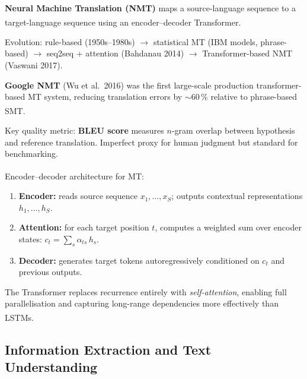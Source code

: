 \begin{tcbitemize}[ skin=sectionraster ]

    \tcbitem[title=Machine Translation, raster multicolumn=3]
    \textbf{Neural Machine Translation (NMT)} maps a source-language sequence to a
    target-language sequence using an encoder--decoder
    Transformer.\textsuperscript{\cite[][p.~7]{dhamaniIntroductionGenerativeAI2024}}

    Evolution: rule-based (1950s--1980s) $\to$ statistical MT (IBM models, phrase-based)
    $\to$ seq2seq + attention (Bahdanau 2014) $\to$ Transformer-based NMT (Vaswani 2017).

    \textbf{Google NMT} (Wu et al.\ 2016) was the first large-scale production
    transformer-based MT system, reducing translation errors by $\sim$60\,\% relative to
    phrase-based
    SMT.\textsuperscript{\cite[][p.~9]{dhamaniIntroductionGenerativeAI2024}}

    Key quality metric: \textbf{BLEU score} measures $n$-gram overlap between hypothesis
    and reference translation. Imperfect proxy for human judgment but standard for
    benchmarking.

    \tcbitem[title=Sequence-to-Sequence with Attention, raster multicolumn=3]
    Encoder--decoder architecture for
    MT:\textsuperscript{\cite[][p.~7-8]{dhamaniIntroductionGenerativeAI2024}}
    \begin{enumerate}
        \item \textbf{Encoder:} reads source sequence $x_1,\ldots,x_S$; outputs
              contextual representations $h_1,\ldots,h_S$.
        \item \textbf{Attention:} for each target position $t$, computes a weighted sum
              over encoder states:
              $c_t = \sum_s \alpha_{ts}\,h_s$.
        \item \textbf{Decoder:} generates target tokens autoregressively conditioned
              on $c_t$ and previous outputs.
    \end{enumerate}
    The Transformer replaces recurrence entirely with \emph{self-attention}, enabling
    full parallelisation and capturing long-range dependencies more effectively than
    LSTMs.\textsuperscript{\cite[][]{vaswaniAttentionAllYou2023}}

\end{tcbitemize}

\subsection{Information Extraction and Text Understanding}

